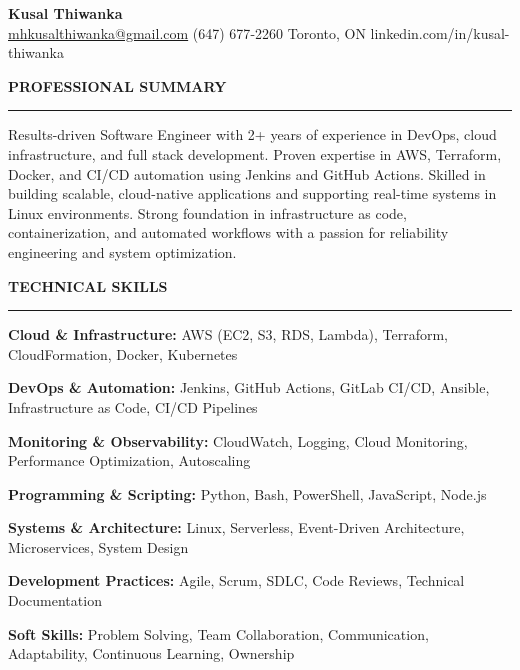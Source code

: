 \documentclass[10pt,letterpaper]{article}
\begin{document}
\begin{center}
{\LARGE\textbf{Kusal Thiwanka}}\\[3pt]
\href{mailto:mhkusalthiwanka@gmail.com}{mhkusalthiwanka@gmail.com}\hspace{2em}%
(647) 677{-}2260\hspace{2em}%
Toronto, ON\hspace{2em}
linkedin.com/in/kusal-thiwanka
\end{center}

\vspace{6pt}

\textbf{PROFESSIONAL SUMMARY}\\[-8pt]
\noindent\rule{\textwidth}{1pt}

\vspace{-2pt}

Results-driven Software Engineer with 2+ years of experience in DevOps, cloud infrastructure, and full stack development. Proven expertise in AWS, Terraform, Docker, and CI/CD automation using Jenkins and GitHub Actions. Skilled in building scalable, cloud-native applications and supporting real-time systems in Linux environments. Strong foundation in infrastructure as code, containerization, and automated workflows with a passion for reliability engineering and system optimization.

\vspace{8pt}

\textbf{TECHNICAL SKILLS}\\[-8pt]
\noindent\rule{\textwidth}{1pt}

\vspace{-2pt}

\textbf{Cloud \& Infrastructure:} AWS (EC2, S3, RDS, Lambda), Terraform, CloudFormation, Docker, Kubernetes

\textbf{DevOps \& Automation:} Jenkins, GitHub Actions, GitLab CI/CD, Ansible, Infrastructure as Code, CI/CD Pipelines

\textbf{Monitoring \& Observability:} CloudWatch, Logging, Cloud Monitoring, Performance Optimization, Autoscaling

\textbf{Programming \& Scripting:} Python, Bash, PowerShell, JavaScript, Node.js

\textbf{Systems \& Architecture:} Linux, Serverless, Event-Driven Architecture, Microservices, System Design

\textbf{Development Practices:} Agile, Scrum, SDLC, Code Reviews, Technical Documentation

\textbf{Soft Skills:} Problem Solving, Team Collaboration, Communication, Adaptability, Continuous Learning, Ownership
\end{document}
